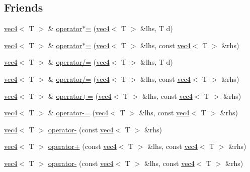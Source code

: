 \subsection*{Friends}
\begin{CompactItemize}
\item 
\hyperlink{classnv_1_1vec4}{vec4}$<$ T $>$ \& \hyperlink{classnv_1_1vec4_e65c5a39b3a0919fbd11005040b83d93}{operator$\ast$=} (\hyperlink{classnv_1_1vec4}{vec4}$<$ T $>$ \&lhs, T d)
\item 
\hyperlink{classnv_1_1vec4}{vec4}$<$ T $>$ \& \hyperlink{classnv_1_1vec4_db31e94e1ef43e088572ee682aa5ab6c}{operator$\ast$=} (\hyperlink{classnv_1_1vec4}{vec4}$<$ T $>$ \&lhs, const \hyperlink{classnv_1_1vec4}{vec4}$<$ T $>$ \&rhs)
\item 
\hyperlink{classnv_1_1vec4}{vec4}$<$ T $>$ \& \hyperlink{classnv_1_1vec4_0c2ce7247eaf12932a608e657e3aec52}{operator/=} (\hyperlink{classnv_1_1vec4}{vec4}$<$ T $>$ \&lhs, T d)
\item 
\hyperlink{classnv_1_1vec4}{vec4}$<$ T $>$ \& \hyperlink{classnv_1_1vec4_19980a11fa7178d3cb0d8ca2380fbd8e}{operator/=} (\hyperlink{classnv_1_1vec4}{vec4}$<$ T $>$ \&lhs, const \hyperlink{classnv_1_1vec4}{vec4}$<$ T $>$ \&rhs)
\item 
\hyperlink{classnv_1_1vec4}{vec4}$<$ T $>$ \& \hyperlink{classnv_1_1vec4_bea67e054b76ea133d0b20187cb6da7e}{operator+=} (\hyperlink{classnv_1_1vec4}{vec4}$<$ T $>$ \&lhs, const \hyperlink{classnv_1_1vec4}{vec4}$<$ T $>$ \&rhs)
\item 
\hyperlink{classnv_1_1vec4}{vec4}$<$ T $>$ \& \hyperlink{classnv_1_1vec4_54e1e773b4df6a71b19eb4b5781a7ead}{operator-=} (\hyperlink{classnv_1_1vec4}{vec4}$<$ T $>$ \&lhs, const \hyperlink{classnv_1_1vec4}{vec4}$<$ T $>$ \&rhs)
\item 
\hyperlink{classnv_1_1vec4}{vec4}$<$ T $>$ \hyperlink{classnv_1_1vec4_8cc817f95174f06a8388b7fc2b8c2d3f}{operator-} (const \hyperlink{classnv_1_1vec4}{vec4}$<$ T $>$ \&rhs)
\item 
\hyperlink{classnv_1_1vec4}{vec4}$<$ T $>$ \hyperlink{classnv_1_1vec4_5ddc069514681de9e350c3f082431fd7}{operator+} (const \hyperlink{classnv_1_1vec4}{vec4}$<$ T $>$ \&lhs, const \hyperlink{classnv_1_1vec4}{vec4}$<$ T $>$ \&rhs)
\item 
\hyperlink{classnv_1_1vec4}{vec4}$<$ T $>$ \hyperlink{classnv_1_1vec4_212f0e52efde08a0093d329fcdaad1a3}{operator-} (const \hyperlink{classnv_1_1vec4}{vec4}$<$ T $>$ \&lhs, const \hyperlink{classnv_1_1vec4}{vec4}$<$ T $>$ \&rhs)
\item 

\end{CompactItemize}
